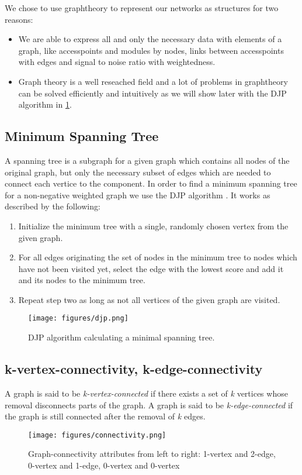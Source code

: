   We chose to use graphtheory to represent our networks as structures for two reasons:
  \begin{itemize}
   \item We are able to express all and only the necessary data with elements of a graph, like
    accesspoints and modules by nodes, links between accesspoints with edges and signal to noise ratio with weightedness. 
   \item Graph theory is a well reseached field and a lot of problems in graphtheory can be solved efficiently and intuitively 
    as we will show later with the \ac{DJP} algorithm in \ref{fig:djp}.
  \end{itemize}
    
  \subsection{Minimum Spanning Tree}
    A spanning tree is a subgraph for a given graph which contains all nodes of the original graph, but only the necessary subset of edges which are needed to connect each vertice
    to the component. In order to find a minimum spanning tree for a non-negative weighted graph we use the DJP algorithm \cite{prim}\cite{jarnik}.
    It works as described by the following:
    \begin{enumerate}
     \item Initialize the minimum tree with a single, randomly chosen vertex from the given graph.
     \item For all edges originating the set of nodes in the minimum tree to nodes which have not been visited yet, select the edge with the lowest score and add it and its nodes 
      to the minimum tree.
     \item Repeat step two as long as not all vertices of the given graph are visited.
    \end{enumerate}
    \begin{figure}[th!]
      \centering
      \texttt{[image: figures/djp.png]}
      \caption{DJP algorithm calculating a minimal spanning tree.}
      \label{fig:djp}
    \end{figure}
    
  \subsection{k-vertex-connectivity, k-edge-connectivity}
    A graph is said to be \textit{k-vertex-connected} if there exists a set of \textit{k} vertices whose removal disconnects parts of the graph.\newline
    A graph is said to be \textit{k-edge-connected} if the graph is still connected after the removal of \textit{k} edges.
    \begin{figure}[th!]
      \centering
      \texttt{[image: figures/connectivity.png]}
      \caption{Graph-connectivity attributes from left to right: 1-vertex and 2-edge, 0-vertex and 1-edge, 0-vertex and 0-vertex}
      \label{fig:connectivity}
    \end{figure}
    
